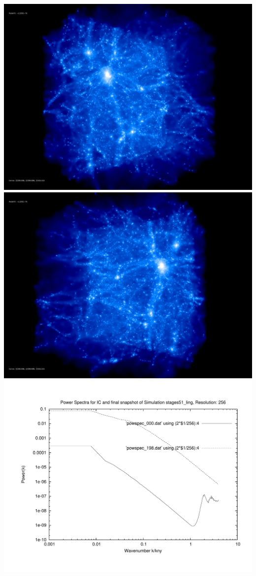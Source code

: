 \includegraphics[scale=0.1]{r256/stages51_ling/rotate_00074.jpg} 
\includegraphics[scale=0.1]{r256/stages51_ling/rotate_00131.jpg}  \\

\includegraphics[scale=0.5]{r256/stages51_ling/plot_powspec_stages51_ling}

